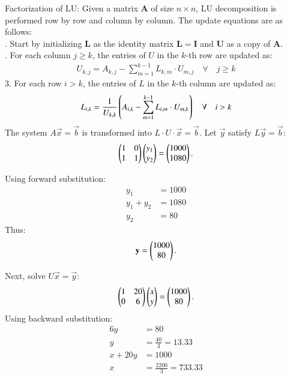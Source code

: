 \documentclass[journal]{IEEEtran}
\begin{document}
Factorization of LU:\newline
Given a matrix $ \mathbf{A} $ of size $ n \times n $, LU decomposition is performed row by row and column by column. The update equations are as follows: \\ 
. Start by initializing $ \mathbf{L} $ as the identity matrix $ \mathbf{L} = \mathbf{I} $ and $ \mathbf{U} $ as a copy of $ \mathbf{A} $.\\
. For each column $ j \geq k $, the entries of $ U $ in the $ k $-th row are updated as:
\begin{align}
U_{k,j} = A_{k,j} - \sum_{m=1}^{k-1} L_{k,m} \cdot U_{m,j}\quad \forall \quad j \geq k
\end{align}
3. For each row $ i > k $, the entries of $ L $ in the $ k $-th column are updated as:
\begin{align}
L_{i,k} = \frac{1}{U_{k,k}} \left( A_{i,k} - \sum_{m=1}^{k-1} L_{i,m} \cdot U_{m,k}\right) \quad \forall \quad i > k
\end{align}
The system $A\vec{x} = \vec{b}$ is transformed into $L \cdot U \cdot \vec{x} = \vec{b}$. Let $\vec{y}$ satisfy $L\vec{y} = \vec{b}$:
\begin{align}
    \begin{pmatrix}1 & 0 \\ 1 & 1\end{pmatrix} \begin{pmatrix}y_1 \\ y_2\end{pmatrix} = \begin{pmatrix}1000 \\ 1080\end{pmatrix}.
\end{align}

Using forward substitution:
\begin{align}
    y_1 &= 1000 \\
    y_1 + y_2 &= 1080\\
    y_2 &= 80
\end{align}
Thus:
\begin{align}
    \mathbf{y} = \begin{pmatrix}1000 \\ 80\end{pmatrix}.
\end{align}

Next, solve $U\vec{x} = \vec{y}$:
\begin{align}
    \begin{pmatrix}1 & 20 \\ 0 & 6\end{pmatrix} \begin{pmatrix}x \\ y\end{pmatrix} = \begin{pmatrix}1000 \\ 80\end{pmatrix}.
\end{align}
Using backward substitution:
\begin{align}
    6y &= 80 \\
    y &= \frac{40}{3} = 13.33\\
    x + 20y &= 1000\\
    x &= \frac{2200}{3} = 733.33
\end{align}
\end{document}
